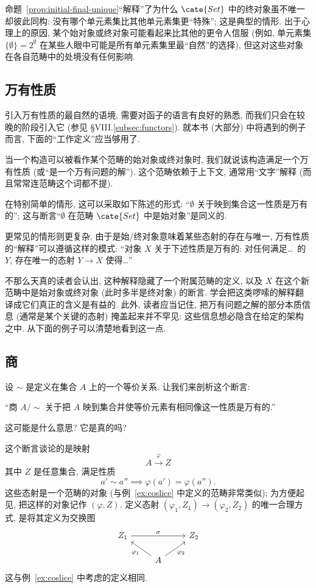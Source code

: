命题~\ref{prop:initial-final-unique}``解释''了为什么 $\cate{Set}$ 中的终对象虽不唯一却彼此同构: 没有哪个单元素集比其他单元素集更``特殊''; 这是典型的情形. 出于心理上的原因, 某个始对象或终对象可能看起来比其他的更令人信服 (例如, 单元素集 $\{\emptyset\} = 2^{\emptyset}$ 在某些人眼中可能是所有单元素集里最``自然''的选择), 但这对这些对象在各自范畴中的处境没有任何影响.

\subsection{万有性质}
\label{subsec:universal-properties}

引入万有性质的最自然的语境, 需要对函子的语言有良好的熟悉, 而我们只会在较晚的阶段引入它 (参见 \S VIII.\ref{subsec:functors}). 就本书 (大部分) 中将遇到的例子而言, 下面的``工作定义''应当够用了.

当一个构造可以被看作某个范畴的始对象或终对象时, 我们就说该构造满足一个万有性质 (或``是一个万有问题的解''). 这个范畴依赖于上下文, 通常用``文字''解释 (而且常常连范畴这个词都不提).

在特别简单的情形, 这可以采取如下陈述的形式: ``$\emptyset$ 关于映到集合这一性质是万有的''; 这与断言``$\emptyset$ 在范畴 $\cate{Set}$ 中是始对象''是同义的.

更常见的情形则更复杂. 由于是始/终对象意味着某些态射的存在与唯一, 万有性质的``解释''可以遵循这样的模式: ``对象 $X$ 关于下述性质是万有的: 对任何满足\ldots\ 的 $Y$, 存在唯一的态射 $Y \rightarrow X$ 使得\ldots''

不那么天真的读者会认出, 这种解释隐藏了一个附属范畴的定义, 以及 $X$ 在这个新范畴中是始对象或终对象 (此时多半是终对象) 的断言. 学会把这类啰嗦的解释翻译成它们真正的含义是有益的. 此外, 读者应当记住, 把万有问题之解的部分本质信息 (通常是某个关键的态射) 掩盖起来并不罕见: 这些信息想必隐含在给定的架构之中. 从下面的例子可以清楚地看到这一点.

\subsection{商}
\label{subsec:quotients-up}

设 $\sim$ 是定义在集合 $A$ 上的一个等价关系. 让我们来剖析这个断言:

``商 $A / {\sim}$ 关于把 $A$ 映到集合并使等价元素有相同像这一性质是万有的.''

这可能是什么意思? 它是真的吗?

这个断言谈论的是映射
\[
A \xrightarrow{\varphi} Z
\]
其中 $Z$ 是任意集合, 满足性质
\[
a' \sim a'' \implies \varphi(a') = \varphi(a'').
\]
这些态射是一个范畴的对象 (与例~\ref{ex:coslice} 中定义的范畴非常类似); 为方便起见, 把这样的对象记作 $(\varphi, Z)$. 定义态射 $(\varphi_1, Z_1) \to (\varphi_2, Z_2)$ 的唯一合理方式, 是将其定义为交换图
\[\begin{tikzcd}[row sep=scriptsize]
	{Z_1} && {Z_2} \\
	& A
	\arrow["\sigma", from=1-1, to=1-3]
	\arrow["{\varphi_1}", from=2-2, to=1-1]
	\arrow["{\varphi_2}"', from=2-2, to=1-3]
\end{tikzcd}\]
这与例~\ref{ex:coslice} 中考虑的定义相同.

